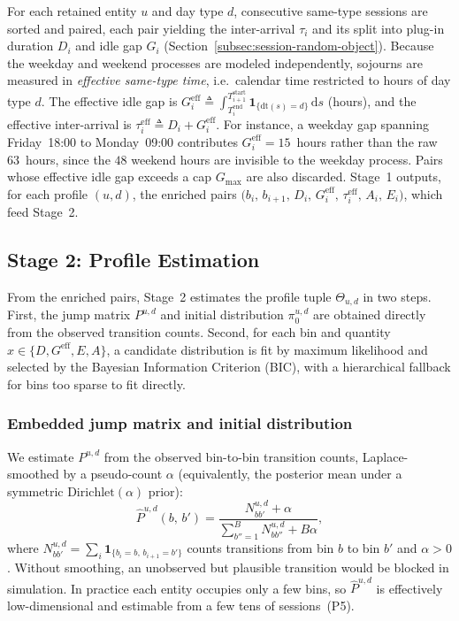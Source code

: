 \documentclass[journal]{IEEEtran}
\begin{document}
For each retained entity $u$ and day type $d$, consecutive same-type sessions are sorted and paired, each pair yielding the inter-arrival $\tau_i$ and its split into plug-in duration $D_i$ and idle gap $G_i$ (Section~\ref{subsec:session-random-object}). Because the weekday and weekend processes are modeled independently, sojourns are measured in \emph{effective same-type time}, i.e.\ calendar time restricted to hours of day type $d$. The effective idle gap is $G_i^{\mathrm{eff}} \triangleq \int_{T_i^{\mathrm{end}}}^{T_{i+1}^{\mathrm{start}}} \mathbf{1}_{\{\mathrm{dt}(s) = d\}}\, \mathrm{d}s$ (hours), and the effective inter-arrival is $\tau_i^{\mathrm{eff}} \triangleq D_i + G_i^{\mathrm{eff}}$. For instance, a weekday gap spanning Friday~18:00 to Monday~09:00 contributes $G_i^{\mathrm{eff}} = 15$~hours rather than the raw $63$~hours, since the $48$ weekend hours are invisible to the weekday process. Pairs whose effective idle gap exceeds a cap $G_{\max}$ are also discarded. Stage~1 outputs, for each profile $(u, d)$, the enriched pairs $\bigl(b_i,\, b_{i+1},\, D_i,\, G_i^{\mathrm{eff}},\, \tau_i^{\mathrm{eff}},\, A_i,\, E_i\bigr)$, which feed Stage~2.

\subsection{Stage 2: Profile Estimation}
\label{subsec:stage2}

From the enriched pairs, Stage~2 estimates the profile tuple $\Theta_{u,d}$ in two steps. First, the jump matrix $P^{u,d}$ and initial distribution $\pi_0^{u,d}$ are obtained directly from the observed transition counts. Second, for each bin and quantity $x \in \{D, G^{\mathrm{eff}}, E, A\}$, a candidate distribution is fit by maximum likelihood and selected by the Bayesian Information Criterion (BIC), with a hierarchical fallback for bins too sparse to fit directly.

\subsubsection{Embedded jump matrix and initial distribution}

We estimate $P^{u,d}$ from the observed bin-to-bin transition counts, Laplace-smoothed by a pseudo-count $\alpha$ (equivalently, the posterior mean under a symmetric $\mathrm{Dirichlet}(\alpha)$ prior):
\begin{equation}
    \hat{P}^{u,d}(b,\, b') =
    \frac{N_{bb'}^{u,d} + \alpha}
         {\displaystyle\sum_{b''=1}^{B} N_{bb''}^{u,d} + B\alpha},
    \label{eq:jump-matrix-est}
\end{equation}
where $N_{bb'}^{u,d} = \sum_i \mathbf{1}_{\{b_i = b,\, b_{i+1} = b'\}}$ counts transitions from bin $b$ to bin $b'$ and $\alpha > 0$. Without smoothing, an unobserved but plausible transition would be blocked in simulation. In practice each entity occupies only a few bins, so $\hat{P}^{u,d}$ is effectively low-dimensional and estimable from a few tens of sessions~(P5).
\end{document}

